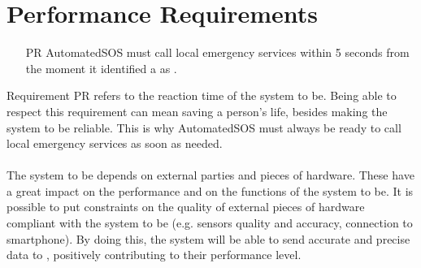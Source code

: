\documentclass[../../rasd.tex]{subfiles}
\begin{document}
\section{Performance Requirements}
\begin{itemize}
	\item[PR\subs{1}]AutomatedSOS must call local emergency services within 5 seconds from the moment it identified a  as .
\end{itemize}
Requirement PR refers to the reaction time of the system to be. Being able to respect this requirement can mean saving a person's life, besides making the system to be reliable. This is why AutomatedSOS must always be ready to call local emergency services as soon as needed.\\\\
The system to be depends on external parties and pieces of hardware. These have a great impact on the performance and on the functions of the system to be. It is possible to put constraints on the quality of external pieces of hardware compliant with the system to be (e.g. sensors quality and accuracy,  connection to smartphone). By doing this, the system will be able to send accurate and precise data to , positively contributing to their performance level.
\end{document}
